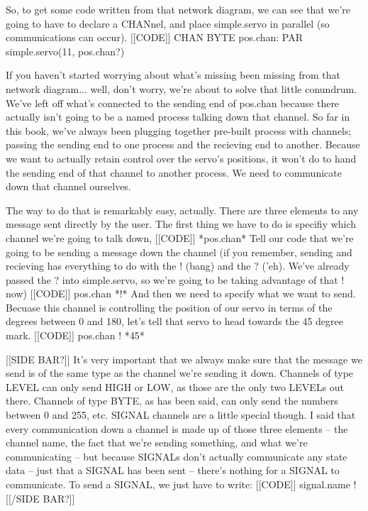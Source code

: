 	So, to get some code written from that network diagram, we can see that we're going to have to declare a CHANnel, and place simple.servo in parallel (so communications can occur).
		[[CODE]]
		CHAN BYTE pos.chan:
		PAR
		  simple.servo(11, pos.chan?)

	If you haven't started worrying about what's missing been missing from that network diagram... well, don't worry, we're about to solve that little conundrum. We've left off what's connected to the sending end of pos.chan because there actually isn't going to be a named process talking down that channel. So far in this book, we've always been plugging together pre-built process with channels; passing the sending end to one process and the recieving end to another. Because we want to actually retain control over the servo's positions, it won't do to hand the sending end of that channel to another process. We need to communicate down that channel ourselves.

	The way to do that is remarkably easy, actually. There are three elements to any message sent directly by the user. The first thing we have to do is specifiy which channel we're going to talk down,
		[[CODE]]
		*pos.chan*
	Tell our code that we're going to be sending a message down the channel (if you remember, sending and recieving has everything to do with the ! (bang) and the ? ('eh). We've already passed the ? into simple.servo, so we're going to be taking advantage of that ! now)
		[[CODE]]
		pos.chan *!*
	And then we need to specify what we want to send. Becuase this channel is controlling the position of our servo in terms of the degrees between 0 and 180, let's tell that servo to head towards the 45 degree mark.
		[[CODE]]
		pos.chan ! *45*

[[SIDE BAR?]]
	It's very important that we always make sure that the message we send is of the same type as the channel we're sending it down. Channels of type LEVEL can only send HIGH or LOW, as those are the only two LEVELs out there. Channels of type BYTE, as has been said, can only send the numbers between 0 and 255, etc.
	SIGNAL channels are a little special though. I said that every communication down a channel is made up of those three elements -- the channel name, the fact that we're sending something, and what we're communicating -- but because SIGNALs don't actually communicate any state data -- just that a SIGNAL has been sent -- there's nothing for a SIGNAL to communicate. To send a SIGNAL, we just have to write:
		[[CODE]]
		signal.name !
[[/SIDE BAR?]]

